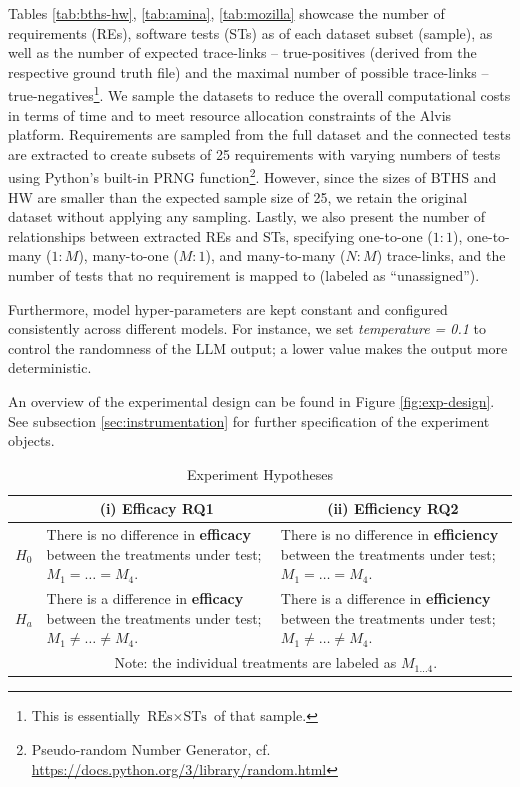 \documentclass[conference]{IEEEtran}
\begin{document}
Tables \ref{tab:bths-hw}, \ref{tab:amina}, \ref{tab:mozilla} showcase the number of requirements (REs), software tests (STs) as of each dataset subset (sample), as well as the number of expected trace-links -- true-positives (derived from the respective ground truth file) and the maximal number of possible trace-links -- true-negatives\footnote{This is essentially $\text{REs} \times \text{STs}$ of that sample.}. We sample the datasets to reduce the overall computational costs in terms of time and to meet resource allocation constraints of the Alvis platform. Requirements are sampled from the full dataset and the connected tests are extracted to create subsets of 25 requirements with varying numbers of tests using Python's built-in PRNG function\footnote{Pseudo-random Number Generator, cf. \url{https://docs.python.org/3/library/random.html}}. However, since the sizes of BTHS and HW are smaller than the expected sample size of 25, we retain the original dataset without applying any sampling. Lastly, we also present the number of relationships between extracted REs and STs, specifying one-to-one ($1{:}1$), one-to-many ($1{:}M$), many-to-one ($M{:}1$), and many-to-many ($N{:}M$) trace-links, and the number of tests that no requirement is mapped to (labeled as ``unassigned'').

Furthermore, model hyper-parameters are kept constant and configured consistently across different models. For instance, we set \textit{temperature = 0.1} to control the randomness of the LLM output; a lower value makes the output more deterministic.

An overview of the experimental design can be found in Figure \ref{fig:exp-design}. See subsection \ref{sec:instrumentation} for further specification of the experiment objects.


\newcommand{\equalM}{$M_{1} = \dots = M_{4}$}
\newcommand{\notEqualM}{$M_{1} \neq \dots \neq M_{4}$}

\begin{table}[h]
    \centering
    \caption{Experiment Hypotheses}
    \renewcommand{\arraystretch}{1.65} %
    \begin{tabular}{@{} c p{3.5cm} p{3.5cm} @{}}
    \toprule
    &\multicolumn{1}{c}{\textbf{(i) Efficacy RQ1}}
    &\multicolumn{1}{c}{\textbf{(ii) Efficiency RQ2}} \\
    \midrule
    $H_{0}$ %
    & There is no difference in \textbf{efficacy} between the treatments
    under test; \equalM.
    & There is no difference in \textbf{efficiency} between the treatments
    under test; \equalM.\\
    $H_{a}$ %
    & There is a difference in \textbf{efficacy} between the treatments
    under test; \notEqualM.
    & There is a difference in \textbf{efficiency} between the treatments
    under test; \notEqualM.\\
    \bottomrule
    &\multicolumn{2}{c}{Note: the individual treatments are labeled as $M_{1\dots4}$.} \\
    \end{tabular}
    \label{tab:hypothesis}
\end{table}
\end{document}
